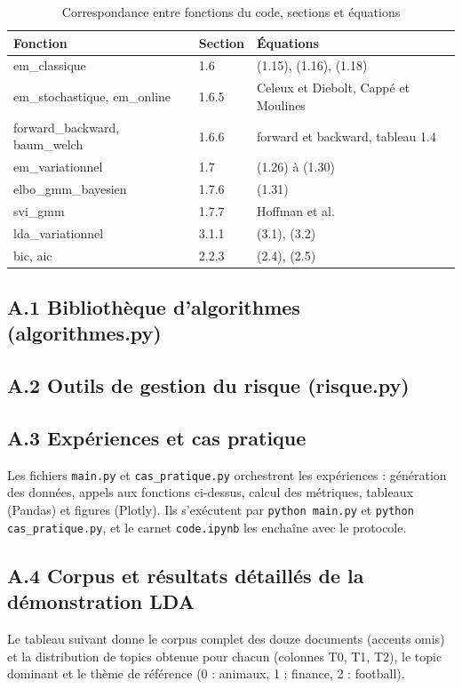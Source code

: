\begin{table}[H]
\centering
\small
\setlength{\tabcolsep}{0.14cm}
\begin{tabular}{|p{5.2cm}|p{4.4cm}|p{5.2cm}|}
\hline
\textbf{Fonction} & \textbf{Section} & \textbf{Équations} \\
\hline
em\_classique & 1.6 & (1.15), (1.16), (1.18) \\
\hline
em\_stochastique, em\_online & 1.6.5 & Celeux et Diebolt, Cappé et Moulines \\
\hline
forward\_backward, baum\_welch & 1.6.6 & forward et backward, tableau 1.4 \\
\hline
em\_variationnel & 1.7 & (1.26) à (1.30) \\
\hline
elbo\_gmm\_bayesien & 1.7.6 & (1.31) \\
\hline
svi\_gmm & 1.7.7 & Hoffman et al. \\
\hline
lda\_variationnel & 3.1.1 & (3.1), (3.2) \\
\hline
bic, aic & 2.2.3 & (2.4), (2.5) \\
\hline
\end{tabular}
\caption{Correspondance entre fonctions du code, sections et équations}
\end{table}

\subsection*{A.1 Bibliothèque d'algorithmes (algorithmes.py)}


\subsection*{A.2 Outils de gestion du risque (risque.py)}


\subsection*{A.3 Expériences et cas pratique}
Les fichiers \texttt{main.py} et \texttt{cas\_pratique.py} orchestrent les expériences : génération des données, appels aux fonctions ci-dessus, calcul des métriques, tableaux (Pandas) et figures (Plotly). Ils s'exécutent par \texttt{python main.py} et \texttt{python cas\_pratique.py}, et le carnet \texttt{code.ipynb} les enchaîne avec le protocole.

\subsection*{A.4 Corpus et résultats détaillés de la démonstration LDA}
Le tableau suivant donne le corpus complet des douze documents (accents omis) et la distribution de topics obtenue pour chacun (colonnes T0, T1, T2), le topic dominant et le thème de référence (0 : animaux, 1 : finance, 2 : football).

